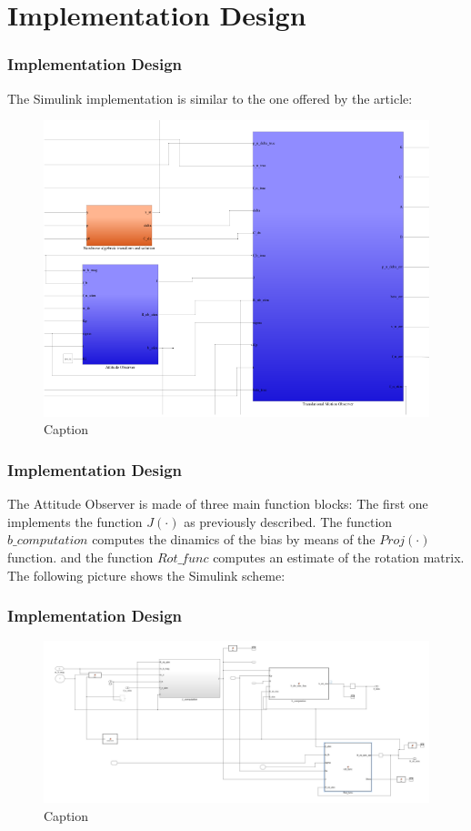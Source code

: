 \documentclass{beamer}
\begin{document}
\section{Implementation Design}
	\begin{frame}
		\frametitle{Implementation Design}
		The Simulink implementation is similar to the one offered by the article:
		\begin{figure}
		    \centering
		    \includegraphics[scale = 0.31]{scheme}
		    \caption{Caption}
		    \label{fig:my_label}
		\end{figure}
	\end{frame}
	\begin{frame}
		\frametitle{Implementation Design}
		The Attitude Observer is made of three main function blocks:
		The first one implements the function $J(\cdot) $ as previously described. 
		The function $b\_computation$ computes the dinamics of the bias by means of the $Proj(\cdot)$ function. and the function $Rot\_func$ computes an estimate of the rotation matrix. 
		The following picture shows the Simulink scheme:
	\end{frame}
	\begin{frame}
		\frametitle{Implementation Design}
		\begin{figure}
		    \centering
		    \includegraphics[scale=0.25]{at}
		    \caption{Caption}
		    \label{fig:my_label2}
		\end{figure}
	\end{frame}
\end{document}
